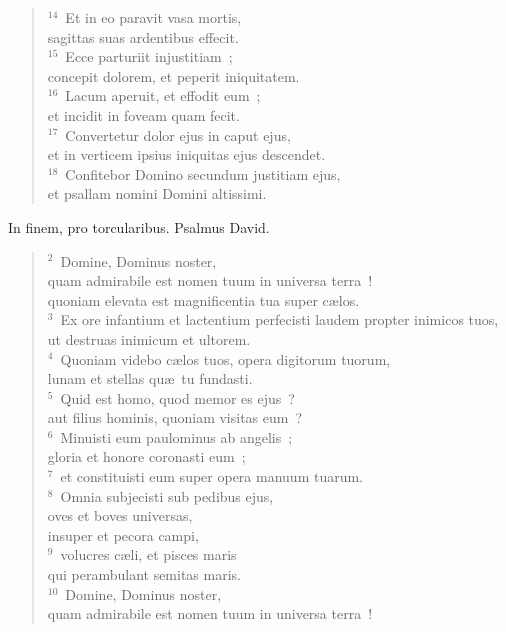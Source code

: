 \begin{flushleft}
\begin{verse}
${}^{14}$~Et in eo paravit vasa mortis,\\ sagittas suas ardentibus effecit.\\
${}^{15}$~Ecce parturiit injustitiam~;\\ concepit dolorem, et peperit iniquitatem.\\
${}^{16}$~Lacum aperuit, et effodit eum~;\\ et incidit in foveam quam fecit.\\
${}^{17}$~Convertetur dolor ejus in caput ejus,\\ et in verticem ipsius iniquitas ejus descendet.\\
${}^{18}$~Confitebor Domino secundum justitiam ejus,\\ et psallam nomini Domini altissimi.\end{verse}\end{flushleft}



\bchapter
\lettrine[lines=3,image=true,loversize=0.05,lraise=-0.03]{I}{}n finem, pro torcularibus. Psalmus David.
\begin{flushleft}\begin{verse}\vspace{6pt}${}^{2}$~Domine, Dominus noster,\\ quam admirabile est nomen tuum in universa terra~!\\ quoniam elevata est magnificentia tua super c\ae los.\\
${}^{3}$~Ex ore infantium et lactentium perfecisti laudem propter inimicos tuos,\\ ut destruas inimicum et ultorem.\\
${}^{4}$~Quoniam videbo c\ae los tuos, opera digitorum tuorum,\\ lunam et stellas qu\ae\ tu fundasti.\\
${}^{5}$~Quid est homo, quod memor es ejus~?\\ aut filius hominis, quoniam visitas eum~?\\
${}^{6}$~Minuisti eum paulominus ab angelis~;\\ gloria et honore coronasti eum~;\\
${}^{7}$~et constituisti eum super opera manuum tuarum.\\
${}^{8}$~Omnia subjecisti sub pedibus ejus,\\ oves et boves universas,\\ insuper et pecora campi,\\
${}^{9}$~volucres c\ae li, et pisces maris\\ qui perambulant semitas maris.\\
${}^{10}$~Domine, Dominus noster,\\ quam admirabile est nomen tuum in universa terra~!\end{verse}\end{flushleft}



